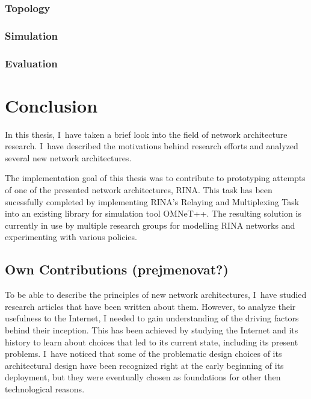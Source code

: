 
        \subsection{Topology}

        \subsection{Simulation}

        \subsection{Evaluation}


\chapter{Conclusion}\label{conclusion}

    In this thesis, I~have taken a brief look into the field of network architecture research. I~have described the motivations behind research efforts and analyzed several new network architectures.

    The implementation goal of this thesis was to contribute to prototyping attempts of one of the presented network architectures, RINA. This task has been sucessfully completed by implementing RINA's Relaying and Multiplexing Task into an existing library for simulation tool OMNeT++. The resulting solution is currently in use by multiple research groups for modelling RINA networks and experimenting with various policies.

    \section{Own Contributions (prejmenovat?)}

    To be able to describe the principles of new network architectures, I~have studied research articles that have been written about them. However, to analyze their usefulness to the Internet, I needed to gain understanding of the driving factors behind their inception. This has been achieved by studying the Internet and its history to learn about choices that led to its current state, including its present problems. I~have noticed that some of the problematic design choices of its architectural design have been recognized right at the early beginning of its deployment, but they were eventually chosen as foundations for other then technological reasons.

